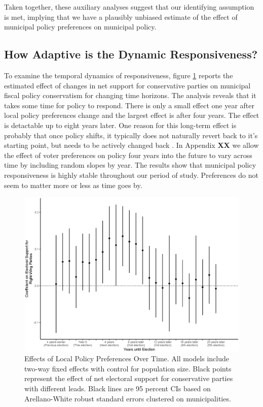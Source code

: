 \documentclass[a4paper,12pt]{article}
\begin{document}
Taken together, these auxiliary analyses suggest that our identifying assumption is met, implying that we have a plausibly unbiased estimate of the effect of municipal policy preferences on municipal policy.

\subsection*{How Adaptive is the Dynamic Responsiveness?}

To examine the temporal dynamics of responsiveness, figure \ref{fig:LongRun} reports the estimated effect of changes in net support for conservative parties on municipal fiscal policy conservatism for changing time horizons. The analysis reveals that it takes some time for policy to respond. There is only a small effect one year after local policy preferences change and the largest effect is after four years. The effect is detactable up to eight years later. One reason for this long-term effect is probably that once policy shifts, it typically does not naturally revert back to it's starting point, but needs to be actively changed back \citep[e.g.,][]{baumgartner2009punctuated}. In Appendix \textbf{XX} we allow the effect of voter preferences on policy four years into the future to vary across time by including random slopes by year. The results show that municipal policy responsiveness is highly stable throughout our period of study. Preferences do not seem to matter more or less as time goes by.

\begin{figure}[htbp]
	\centering
	\includegraphics[scale = .65]{dynamics.eps}
	\caption{Effects of Local Policy Preferences Over Time. All models include two-way fixed effects with control for population size. Black points represent the effect of net electoral support for conservative parties with different leads. Black lines are 95 percent CIs based on Arellano-White robust standard errors clustered on municipalities. }
	\label{fig:LongRun}
\end{figure}
\end{document}
